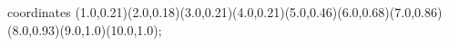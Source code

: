 					coordinates { (1.0,0.21)(2.0,0.18)(3.0,0.21)(4.0,0.21)(5.0,0.46)(6.0,0.68)(7.0,0.86)(8.0,0.93)(9.0,1.0)(10.0,1.0)};